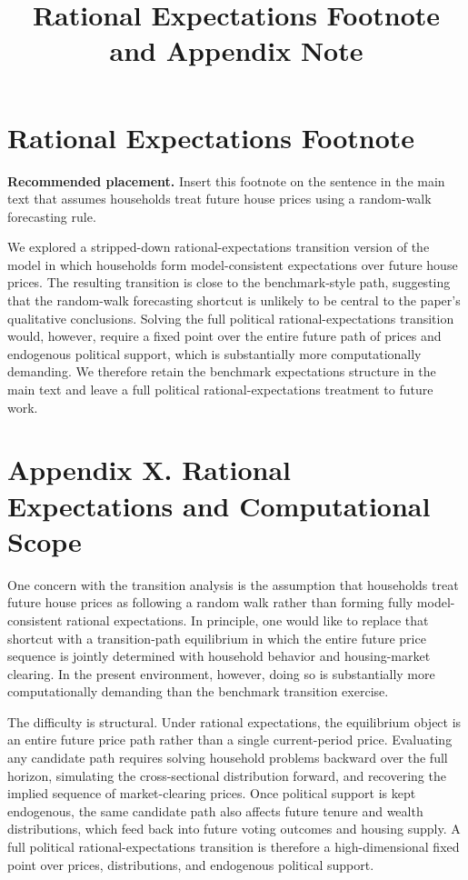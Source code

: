 \documentclass[11pt]{article}
\title{Rational Expectations Footnote and Appendix Note}
\author{}
\date{}
\begin{document}
\maketitle

\section*{Rational Expectations Footnote}

\textbf{Recommended placement.} Insert this footnote on the sentence in the main text that
assumes households treat future house prices using a random-walk forecasting rule.

\medskip

\noindent We explored a stripped-down rational-expectations transition version of the model in
which households form model-consistent expectations over future house prices. The resulting
transition is close to the benchmark-style path, suggesting that the random-walk forecasting
shortcut is unlikely to be central to the paper's qualitative conclusions. Solving the full
political rational-expectations transition would, however, require a fixed point over the entire
future path of prices and endogenous political support, which is substantially more computationally
demanding. We therefore retain the benchmark expectations structure in the main text and leave a
full political rational-expectations treatment to future work.

\section*{Appendix X. Rational Expectations and Computational Scope}

One concern with the transition analysis is the assumption that households treat future house
prices as following a random walk rather than forming fully model-consistent rational
expectations. In principle, one would like to replace that shortcut with a transition-path
equilibrium in which the entire future price sequence is jointly determined with household behavior
and housing-market clearing. In the present environment, however, doing so is substantially more
computationally demanding than the benchmark transition exercise.

The difficulty is structural. Under rational expectations, the equilibrium object is an entire
future price path rather than a single current-period price. Evaluating any candidate path requires
solving household problems backward over the full horizon, simulating the cross-sectional
distribution forward, and recovering the implied sequence of market-clearing prices. Once political
support is kept endogenous, the same candidate path also affects future tenure and wealth
distributions, which feed back into future voting outcomes and housing supply. A full political
rational-expectations transition is therefore a high-dimensional fixed point over prices,
distributions, and endogenous political support.
\end{document}
